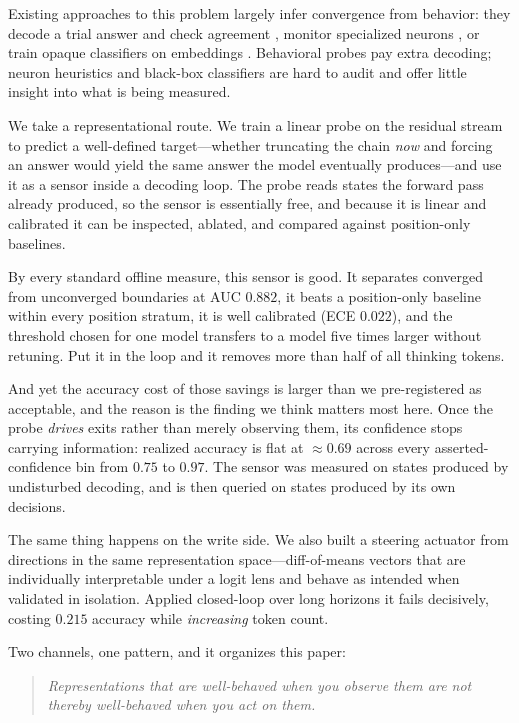 Existing approaches to this problem largely infer convergence from behavior:
they decode a trial answer and check agreement
\cite{dynasor,deer}, monitor
specialized neurons \cite{neat}, or train opaque classifiers on
embeddings \cite{aic}. Behavioral probes pay extra decoding; neuron
heuristics and black-box classifiers are hard to audit and offer little
insight into what is being measured.

We take a representational route. We train a linear probe on the residual
stream to predict a well-defined target---whether truncating the chain
\emph{now} and forcing an answer would yield the same answer the model
eventually produces---and use it as a sensor inside a decoding loop. The probe
reads states the forward pass already produced, so the sensor is essentially
free, and because it is linear and calibrated it can be inspected, ablated,
and compared against position-only baselines.

By every standard offline measure, this sensor is good. It separates converged
from unconverged boundaries at AUC $0.882$, it beats a position-only baseline
within every position stratum, it is well calibrated (ECE $0.022$), and the
threshold chosen for one model transfers to a model five times larger without
retuning. Put it in the loop and it removes more than half of all thinking
tokens.

And yet the accuracy cost of those savings is larger than we pre-registered as
acceptable, and the reason is the finding we think matters most here. Once the
probe \emph{drives} exits rather than merely observing them, its confidence
stops carrying information: realized accuracy is flat at $\approx 0.69$ across
every asserted-confidence bin from $0.75$ to $0.97$. The sensor was measured on
states produced by undisturbed decoding, and is then queried on states produced
by its own decisions.

The same thing happens on the write side. We also built a steering actuator
from directions in the same representation space---diff-of-means vectors that
are individually interpretable under a logit lens and behave as intended when
validated in isolation. Applied closed-loop over long horizons it fails
decisively, costing $0.215$ accuracy while \emph{increasing} token count.

Two channels, one pattern, and it organizes this paper:

\begin{quote}
\emph{Representations that are well-behaved when you observe them are not
thereby well-behaved when you act on them.}
\end{quote}

